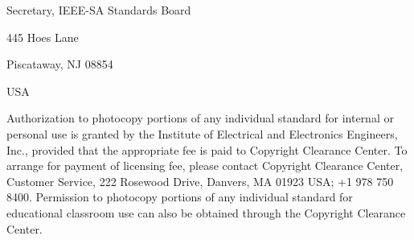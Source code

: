 {{\centering Secretary, IEEE-SA Standards Board\par 445 Hoes Lane\par Piscataway, NJ 08854\par USA\par}
\vspace{9pt}
Authorization to photocopy portions of any individual standard for internal or personal use is granted by the Institute of Electrical and Electronics Engineers, Inc., provided that the appropriate fee is paid to Copyright Clearance Center. To arrange for payment of licensing fee, please contact Copyright Clearance Center, Customer Service, 222 Rosewood Drive, Danvers, MA 01923 USA; +1 978 750 8400. Permission to photocopy portions of any individual standard for educational classroom use can also be obtained through the Copyright Clearance Center.\par
}
\newpage

